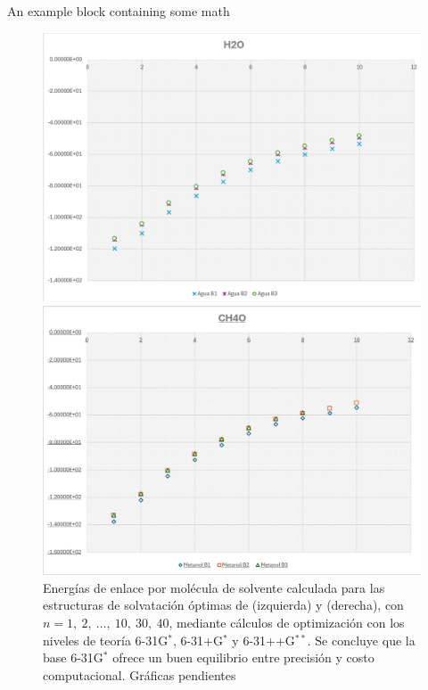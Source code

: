 \documentclass[final]{beamer}
\newlength{\colwidth}
\begin{document}
\begin{frame}[t]
\begin{columns}[t]
\begin{column}{\colwidth}
\begin{block}{An example block containing some math}{}
				\begin{figure}[H]
					\centering
					\begin{minipage}[b]{0.48\textwidth}
						\centering
						\includegraphics[width=\textwidth]{logos/bases_agua.png}
					\end{minipage}%
					\hfill
					\begin{minipage}[b]{0.48\textwidth}
						\centering
						\includegraphics[width=\textwidth]{logos/bases_metanol.png}
					\end{minipage}

					\caption{Energías de enlace por molécula de solvente calculada para las estructuras de solvatación óptimas de  (izquierda) y  (derecha), con $n = 1,\ 2,\ \ldots,\ 10,\ 30,\ 40$, mediante cálculos de optimización con los niveles de teoría 6-31G$^\ast$, 6-31+G$^\ast$ y 6-31++G$^{\ast\ast}$. Se concluye que la base 6-31G$^\ast$ ofrece un buen equilibrio entre precisión y costo computacional. Gráficas pendientes}
					\label{fig:bases}
				\end{figure}
				

\end{block}
\end{column}
\end{columns}
\end{frame}
\end{document}
